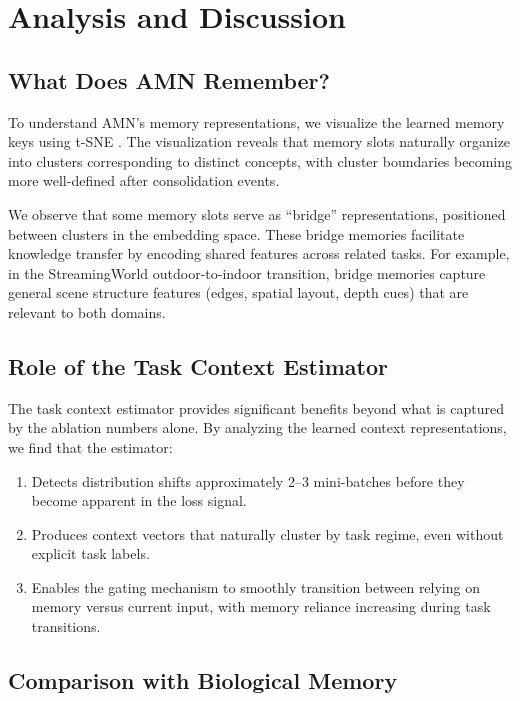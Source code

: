 \documentclass[11pt]{article}
\begin{document}
\section{Analysis and Discussion}
\label{sec:analysis}

\subsection{What Does AMN Remember?}

To understand AMN's memory representations, we visualize the learned memory keys using t-SNE \citep{maaten2008visualizing}. The visualization reveals that memory slots naturally organize into clusters corresponding to distinct concepts, with cluster boundaries becoming more well-defined after consolidation events.

We observe that some memory slots serve as ``bridge'' representations, positioned between clusters in the embedding space. These bridge memories facilitate knowledge transfer by encoding shared features across related tasks. For example, in the StreamingWorld outdoor-to-indoor transition, bridge memories capture general scene structure features (edges, spatial layout, depth cues) that are relevant to both domains.

\subsection{Role of the Task Context Estimator}

The task context estimator provides significant benefits beyond what is captured by the ablation numbers alone. By analyzing the learned context representations, we find that the estimator:
\begin{enumerate}
    \item Detects distribution shifts approximately 2--3 mini-batches before they become apparent in the loss signal.
    \item Produces context vectors that naturally cluster by task regime, even without explicit task labels.
    \item Enables the gating mechanism to smoothly transition between relying on memory versus current input, with memory reliance increasing during task transitions.
\end{enumerate}

\subsection{Comparison with Biological Memory}
\end{document}
